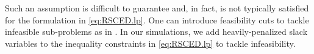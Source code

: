 




Such an assumption is difficult to guarantee and, in fact, is not typically satisfied for the \RSCED{} formulation in \eqref{eq:RSCED.lp}. One can introduce feasibility cuts to tackle infeasible sub-problems as in \cite{grothey1999note}. 
In our simulations, we add heavily-penalized slack variables to the inequality constraints in \eqref{eq:RSCED.lp} to tackle infeasibility.


